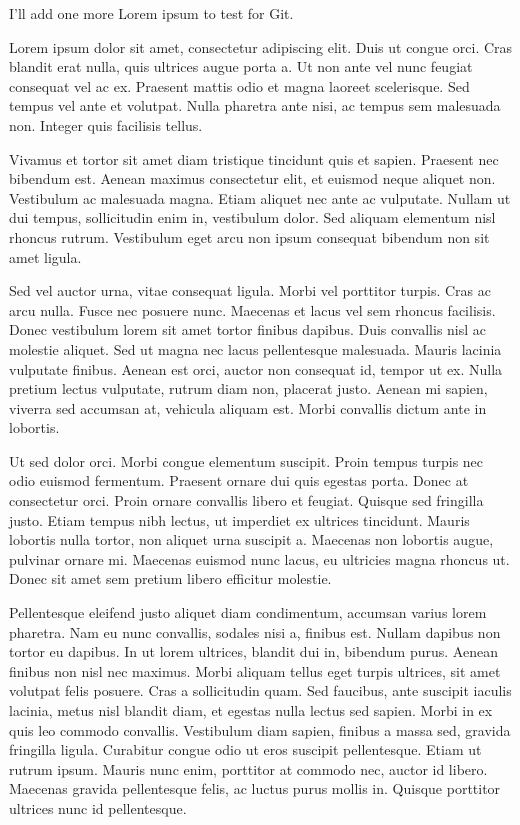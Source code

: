 

\label{chap:introduction}

I'll add one more Lorem ipsum to test for Git.

Lorem ipsum dolor sit amet, consectetur adipiscing elit. Duis ut congue orci. Cras blandit erat nulla, quis ultrices augue porta a. Ut non ante vel nunc feugiat consequat vel ac ex. Praesent mattis odio et magna laoreet scelerisque. Sed tempus vel ante et volutpat. Nulla pharetra ante nisi, ac tempus sem malesuada non. Integer quis facilisis tellus.

Vivamus et tortor sit amet diam tristique tincidunt quis et sapien. Praesent nec bibendum est. Aenean maximus consectetur elit, et euismod neque aliquet non. Vestibulum ac malesuada magna. Etiam aliquet nec ante ac vulputate. Nullam ut dui tempus, sollicitudin enim in, vestibulum dolor. Sed aliquam elementum nisl rhoncus rutrum. Vestibulum eget arcu non ipsum consequat bibendum non sit amet ligula.

Sed vel auctor urna, vitae consequat ligula. Morbi vel porttitor turpis. Cras ac arcu nulla. Fusce nec posuere nunc. Maecenas et lacus vel sem rhoncus facilisis. Donec vestibulum lorem sit amet tortor finibus dapibus. Duis convallis nisl ac molestie aliquet. Sed ut magna nec lacus pellentesque malesuada. Mauris lacinia vulputate finibus. Aenean est orci, auctor non consequat id, tempor ut ex. Nulla pretium lectus vulputate, rutrum diam non, placerat justo. Aenean mi sapien, viverra sed accumsan at, vehicula aliquam est. Morbi convallis dictum ante in lobortis.

Ut sed dolor orci. Morbi congue elementum suscipit. Proin tempus turpis nec odio euismod fermentum. Praesent ornare dui quis egestas porta. Donec at consectetur orci. Proin ornare convallis libero et feugiat. Quisque sed fringilla justo. Etiam tempus nibh lectus, ut imperdiet ex ultrices tincidunt. Mauris lobortis nulla tortor, non aliquet urna suscipit a. Maecenas non lobortis augue, pulvinar ornare mi. Maecenas euismod nunc lacus, eu ultricies magna rhoncus ut. Donec sit amet sem pretium libero efficitur molestie.

Pellentesque eleifend justo aliquet diam condimentum, accumsan varius lorem pharetra. Nam eu nunc convallis, sodales nisi a, finibus est. Nullam dapibus non tortor eu dapibus. In ut lorem ultrices, blandit dui in, bibendum purus. Aenean finibus non nisl nec maximus. Morbi aliquam tellus eget turpis ultrices, sit amet volutpat felis posuere. Cras a sollicitudin quam. Sed faucibus, ante suscipit iaculis lacinia, metus nisl blandit diam, et egestas nulla lectus sed sapien. Morbi in ex quis leo commodo convallis. Vestibulum diam sapien, finibus a massa sed, gravida fringilla ligula. Curabitur congue odio ut eros suscipit pellentesque. Etiam ut rutrum ipsum. Mauris nunc enim, porttitor at commodo nec, auctor id libero. Maecenas gravida pellentesque felis, ac luctus purus mollis in. Quisque porttitor ultrices nunc id pellentesque.

